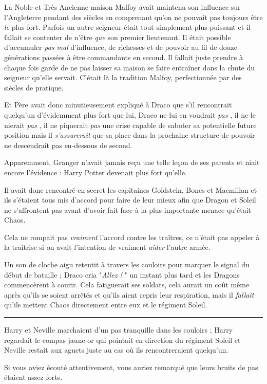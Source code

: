 La Noble et Très Ancienne maison Malfoy avait maintenu son influence sur l'Angleterre pendant des siècles en comprenant qu'on ne pouvait pas toujours être \emph{le}  plus fort. Parfois un autre seigneur était tout simplement plus puissant et il fallait se contenter de n'être \emph{que}  son premier lieutenant. Il était possible d'accumuler \emph{pas mal}  d'influence, de richesses et de pouvoir au fil de douze générations passées à être commandants en second. Il fallait juste prendre à chaque fois garde de ne pas laisser sa maison se faire entraîner dans la chute du seigneur qu'elle servait. C'était là la tradition Malfoy, perfectionnée par des siècles de pratique.

Et Père avait donc minutieusement expliqué à Draco que s'il rencontrait quelqu'un d'évidemment plus fort que lui, Draco ne lui en voudrait \emph{pas} , il ne le nierait \emph{pas} , il ne piquerait \emph{pas}  une crise capable de saboter sa potentielle future position mais il \emph{s'assurerait}  que sa place dans la prochaine structure de pouvoir ne descendrait pas en-dessous de second.

Apparemment, Granger n'avait jamais reçu une telle leçon de ses parents et niait encore l'évidence : Harry Potter devenait plus fort qu'elle.

Il avait donc rencontré en secret les capitaines Goldstein, Bones et Macmillan et ils s'étaient tous mis d'accord pour faire de leur mieux afin que Dragon et Soleil ne s'affrontent pas avant d'avoir fait face à la plus importante menace qu'était Chaos.

Cela ne rompait pas \emph{vraiment}  l'accord contre les traîtres, ce n'était pas appeler à la traîtrise si on avait l'intention de vraiment \emph{aider}  l'autre armée.

Un son de cloche aigu retentit à travers les couloirs pour marquer le signal du début de bataille ; Draco cria "\emph{Allez !} " un instant plus tard et les Dragons commencèrent à courir. Cela fatiguerait ses soldats, cela aurait un coût même après qu'ils se soient arrêtés et qu'ils aient repris leur respiration, mais il \emph{fallait}  qu'ils mettent Chaos directement entre eux et le régiment Soleil.
\par\noindent\rule{\textwidth}{0.4pt}
Harry et Neville marchaient d'un pas tranquille dans les couloirs ; Harry regardait le compas jaune-or qui pointait en direction du régiment Soleil et Neville restait aux aguets juste au cas où ils rencontreraient quelqu'un.

Si vous aviez écouté attentivement, vous auriez remarqué que leurs bruits de pas étaient assez forts.

